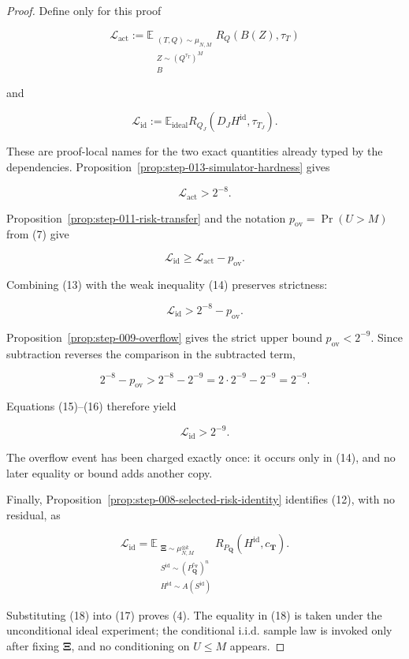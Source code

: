 \begin{proof}
Define only for this proof

\[
\mathcal L_{\mathrm{act}}
:=
\mathbb E_{\substack{(T,Q)\sim\mu_{N,M}\\
                      Z\sim(Q^{\tau_T})^M\\ B}}
R_Q(B(Z),\tau_T)
\tag{11}
\]

and

\[
\mathcal L_{\mathrm{id}}
:=
\mathbb E_{\mathrm{ideal}}
R_{Q_J}(D_JH^{\mathrm{id}},\tau_{T_J}).
\tag{12}
\]

These are proof-local names for the two exact quantities already typed by
the dependencies. Proposition~\ref{prop:step-013-simulator-hardness}
gives

\[
\mathcal L_{\mathrm{act}}>2^{-8}.
\tag{13}
\]

Proposition~\ref{prop:step-011-risk-transfer} and the notation
\(p_{\mathrm{ov}}=\Pr(U>M)\) from (7) give

\[
\mathcal L_{\mathrm{id}}
\ge \mathcal L_{\mathrm{act}}-p_{\mathrm{ov}}.
\tag{14}
\]

Combining (13) with the weak inequality (14) preserves strictness:

\[
\mathcal L_{\mathrm{id}}
>2^{-8}-p_{\mathrm{ov}}.
\tag{15}
\]

Proposition~\ref{prop:step-009-overflow} gives the strict upper
bound \(p_{\mathrm{ov}}<2^{-9}\). Since subtraction reverses the comparison
in the subtracted term,

\[
2^{-8}-p_{\mathrm{ov}}
>2^{-8}-2^{-9}
=2\cdot2^{-9}-2^{-9}
=2^{-9}.
\tag{16}
\]

Equations (15)--(16) therefore yield

\[
\mathcal L_{\mathrm{id}}>2^{-9}.
\tag{17}
\]

The overflow event has been charged exactly once: it occurs only in (14),
and no later equality or bound adds another copy.

Finally, Proposition~\ref{prop:step-008-selected-risk-identity}
identifies (12), with no residual, as

\[
\mathcal L_{\mathrm{id}}
=
\mathbb E_{\substack{\boldsymbol\Xi\sim\mu_{N,M}^{\otimes k}\\
                      S^{\mathrm{id}}\sim
                      (P_{\boldsymbol Q}^{c_{\boldsymbol T}})^n\\
                      H^{\mathrm{id}}\sim A(S^{\mathrm{id}})}}
R_{P_{\boldsymbol Q}}(H^{\mathrm{id}},c_{\boldsymbol T}).
\tag{18}
\]

Substituting (18) into (17) proves (4). The equality in (18) is taken under
the unconditional ideal experiment; the conditional i.i.d. sample law is
invoked only after fixing \(\boldsymbol\Xi\), and no conditioning on
\(U\le M\) appears. \end{proof}

